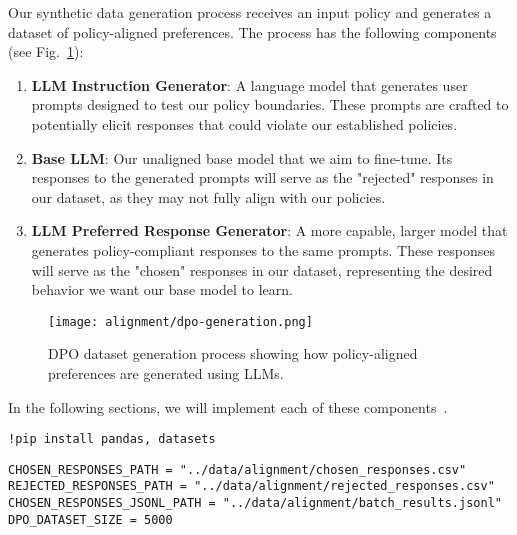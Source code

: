 Our synthetic data generation process receives an input policy and generates a dataset of policy-aligned preferences. The process has the following components (see Fig.~\ref{fig:dpo-generation}):

\begin{enumerate}
\item \textbf{LLM Instruction Generator}: A language model that generates user prompts designed to test our policy boundaries. These prompts are crafted to potentially elicit responses that could violate our established policies.

\item \textbf{Base LLM}: Our unaligned base model that we aim to fine-tune. Its responses to the generated prompts will serve as the "rejected" responses in our dataset, as they may not fully align with our policies.

\item \textbf{LLM Preferred Response Generator}: A more capable, larger model that generates policy-compliant responses to the same prompts. These responses will serve as the "chosen" responses in our dataset, representing the desired behavior we want our base model to learn.
\end{enumerate}

\begin{figure}[H]
\centering
\texttt{[image: alignment/dpo-generation.png]}
\caption{DPO dataset generation process showing how policy-aligned preferences are generated using LLMs.}
\label{fig:dpo-generation}
\end{figure}


In the following sections, we will implement each of these components~.

\begin{verbatim}
!pip install pandas, datasets
\end{verbatim}

\begin{verbatim}
CHOSEN_RESPONSES_PATH = "../data/alignment/chosen_responses.csv"
REJECTED_RESPONSES_PATH = "../data/alignment/rejected_responses.csv"
CHOSEN_RESPONSES_JSONL_PATH = "../data/alignment/batch_results.jsonl"
DPO_DATASET_SIZE = 5000
\end{verbatim}

